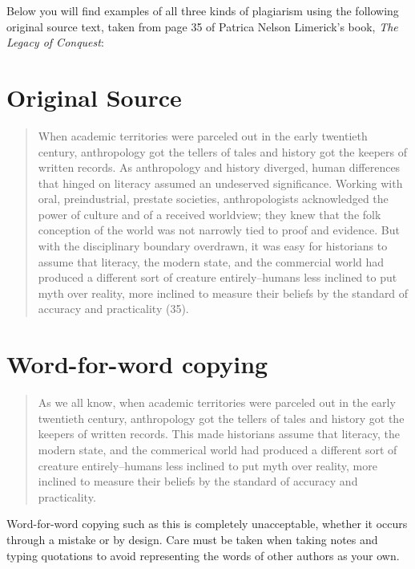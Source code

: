 Below you will find examples of all three kinds of plagiarism using the following original source text, taken from page 35 of Patrica Nelson Limerick's book, \emph{The Legacy of Conquest}:

\section{Original Source}

\begin{quote}
When academic territories were parceled out in the early twentieth century, anthropology got the tellers of tales and history got the keepers of written records.  As anthropology and history diverged, human differences that hinged on literacy assumed an undeserved significance.  Working with oral, preindustrial, prestate societies, anthropologists acknowledged the power of culture and of a received worldview; they knew that the folk conception of the world was not narrowly tied to proof and evidence.  But with the disciplinary boundary overdrawn, it was easy for historians to assume that literacy, the modern state, and the commercial world had produced a different sort of creature entirely--humans less inclined to put myth over reality, more inclined to measure their beliefs by the standard of accuracy and practicality (35).
\end{quote}

\section{Word-for-word copying}

\begin{Spacing}{1.5}
\begin{quote}
As we all know, when academic territories were parceled out in the early twentieth century, anthropology got the tellers of tales and history got the keepers of written records. This made historians assume that literacy, the modern state, and the commerical world had produced a different sort of creature entirely--humans less inclined to put myth over reality, more inclined to measure their beliefs by the standard of accuracy and practicality. 
\end{quote} 

\end{Spacing}

 Word-for-word copying such as this is completely unacceptable, whether it occurs through a mistake or by design. Care must be taken when taking notes and typing quotations to avoid representing the words of other authors as your own. 

